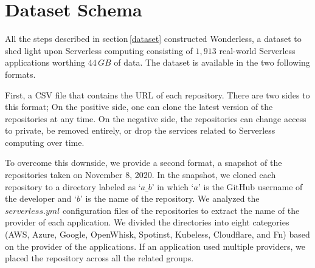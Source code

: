 \section{Dataset Schema}
\label{schema}

All the steps described in section\,\ref{dataset} constructed Wonderless, 
a dataset to shed light upon Serverless computing consisting of $1,913$
real-world Serverless applications worthing $44 \, GB$ of data. The dataset 
is available in the two following formats.

First, a CSV file that contains the URL of each repository. There are two 
sides to this format; On the positive side, one can clone the latest version 
of the repositories at any time. On the negative side, the repositories can 
change access to private, be removed entirely, or drop the services related 
to Serverless computing over time.

To overcome this downside, we provide a second format, a snapshot of the 
repositories taken on November 8, 2020. In the snapshot, we cloned each 
repository to a directory labeled as `$a\_b$' in which `$a$' is the GitHub 
username of the developer and `$b$' is the name of the repository. 
We analyzed the $serverless.yml$ configuration files of the repositories 
to extract the name of the provider of each application. We divided the 
directories into eight categories\,(AWS, Azure, Google, OpenWhisk, Spotinst, 
Kubeless, Cloudflare, and Fn) based on the provider of the applications. 
If an application used multiple providers, we placed the repository across 
all the related groups. 
